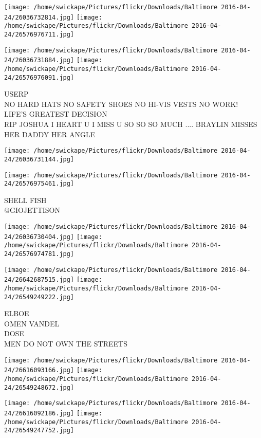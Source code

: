 \documentclass[10pt,letterpaper]{article}
\begin{document}
\texttt{[image: /home/swickape/Pictures/flickr/Downloads/Baltimore 2016-04-24/26036732814.jpg]}
\texttt{[image: /home/swickape/Pictures/flickr/Downloads/Baltimore 2016-04-24/26576976711.jpg]}

\texttt{[image: /home/swickape/Pictures/flickr/Downloads/Baltimore 2016-04-24/26036731884.jpg]}
\texttt{[image: /home/swickape/Pictures/flickr/Downloads/Baltimore 2016-04-24/26576976091.jpg]}

USERP\\
NO HARD HATS NO SAFETY SHOES NO HI{-}VIS VESTS NO WORK!\\
LIFE'S GREATEST DECISION\\
RIP JOSHUA I HEART U I MISS U SO SO SO MUCH .... BRAYLIN MISSES HER DADDY HER ANGLE
\pagebreak

\texttt{[image: /home/swickape/Pictures/flickr/Downloads/Baltimore 2016-04-24/26036731144.jpg]}

\vspace{0.25in}
\texttt{[image: /home/swickape/Pictures/flickr/Downloads/Baltimore 2016-04-24/26576975461.jpg]}

SHELL FISH\\
@GIOJETTISON
\pagebreak

\texttt{[image: /home/swickape/Pictures/flickr/Downloads/Baltimore 2016-04-24/26036730404.jpg]}
\texttt{[image: /home/swickape/Pictures/flickr/Downloads/Baltimore 2016-04-24/26576974781.jpg]}

\texttt{[image: /home/swickape/Pictures/flickr/Downloads/Baltimore 2016-04-24/26642687515.jpg]}
\texttt{[image: /home/swickape/Pictures/flickr/Downloads/Baltimore 2016-04-24/26549249222.jpg]}

ELBOE\\
OMEN VANDEL\\
DOSE\\
MEN DO NOT OWN THE STREETS
\pagebreak

\texttt{[image: /home/swickape/Pictures/flickr/Downloads/Baltimore 2016-04-24/26616093166.jpg]}
\texttt{[image: /home/swickape/Pictures/flickr/Downloads/Baltimore 2016-04-24/26549248672.jpg]}

\texttt{[image: /home/swickape/Pictures/flickr/Downloads/Baltimore 2016-04-24/26616092186.jpg]}
\texttt{[image: /home/swickape/Pictures/flickr/Downloads/Baltimore 2016-04-24/26549247752.jpg]}
\end{document}
